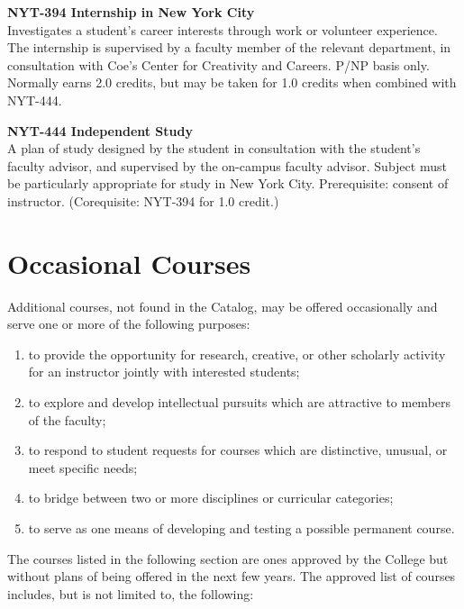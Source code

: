 \documentclass[
  letterpaper,
]{scrbook}
\providecommand{\tightlist}{%
  \setlength{\itemsep}{0pt}\setlength{\parskip}{0pt}}
\begin{document}
\textbf{NYT-394 Internship in New York City}\\
Investigates a student's career interests through work or volunteer
experience. The internship is supervised by a faculty member of the
relevant department, in consultation with Coe's Center for Creativity
and Careers. P/NP basis only. Normally earns 2.0 credits, but may be
taken for 1.0 credits when combined with NYT-444.

\textbf{NYT-444 Independent Study}\\
A plan of study designed by the student in consultation with the
student's faculty advisor, and supervised by the on-campus faculty
advisor. Subject must be particularly appropriate for study in New York
City. Prerequisite: consent of instructor. (Corequisite: NYT-394 for 1.0
credit.)

\section{Occasional
Courses}\label{sec-academic-programs-occasional-courses}

Additional courses, not found in the Catalog, may be offered
occasionally and serve one or more of the following purposes:

\begin{enumerate}
\def\labelenumi{\arabic{enumi}.}
\tightlist
\item
  to provide the opportunity for research, creative, or other scholarly
  activity for an instructor jointly with interested students;
\item
  to explore and develop intellectual pursuits which are attractive to
  members of the faculty;
\item
  to respond to student requests for courses which are distinctive,
  unusual, or meet specific needs;
\item
  to bridge between two or more disciplines or curricular categories;
\item
  to serve as one means of developing and testing a possible permanent
  course.
\end{enumerate}

The courses listed in the following section are ones approved by the
College but without plans of being offered in the next few years. The
approved list of courses includes, but is not limited to, the following:
\end{document}
